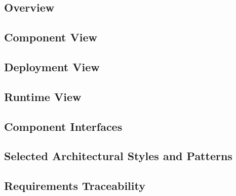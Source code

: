 \subsection{Overview}
\label{sect:architecture:overview}


\subsection{Component View}
\label{sect:architecture:components}


\subsection{Deployment View}
\label{sect:architecture:deployment}


\subsection{Runtime View}
\label{sect:architecture:runtime}


\subsection{Component Interfaces}
\label{sect:architecture:interfaces}


\subsection{Selected Architectural Styles and Patterns}
\label{sect:architecture:patterns}


\subsection{Requirements Traceability}
\label{sect:architecture:traceability}
